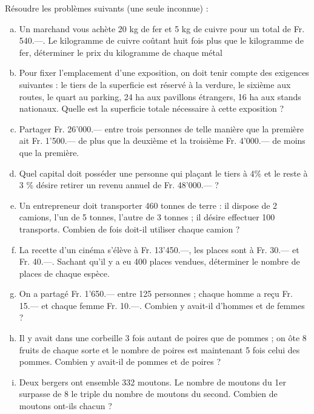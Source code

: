 \documentclass[12pt, addpoints]{exam}
\begin{document}
\begin{exercice}\label{exercice1}
Résoudre les problèmes suivants (une seule inconnue) :
\begin{enumerate}[a)]
\item Un marchand vous achète 20 kg de fer et 5 kg de cuivre pour un total de Fr. 540.—. Le kilogramme de cuivre coûtant huit fois plus que le kilogramme de fer, déterminer le prix du kilogramme de chaque métal

\item Pour fixer l’emplacement d’une exposition, on doit tenir compte des exigences suivantes : le tiers de la superficie est réservé à la verdure, le sixième aux routes, le quart au parking, 24 ha aux pavillons étrangers, 16 ha aux stands nationaux. Quelle est la superficie totale nécessaire à cette exposition ?

\item Partager Fr. 26'000.— entre trois personnes de telle manière que la première ait Fr. 1'500.— de plus que la deuxième et la troisième Fr. 4'000.— de moins que la première.

\item Quel capital doit posséder une personne qui plaçant le tiers à 4\% et le reste à 3 \% désire retirer un revenu annuel de Fr. 48'000.— ?

\item Un entrepreneur doit transporter 460 tonnes de terre : il dispose de 2 camions, l’un de 5 tonnes, l’autre de 3 tonnes ; il désire effectuer 100 transports. Combien de fois doit-il utiliser chaque camion ?

\item La recette d’un cinéma s’élève à Fr. 13'450.—, les places sont à Fr. 30.— et Fr. 40.—. Sachant qu’il y a eu 400 places vendues, déterminer le nombre de places de chaque espèce.

\item On a partagé Fr. 1'650.–– entre 125 personnes ; chaque homme a reçu Fr. 15.–– et chaque femme Fr. 10.––. Combien y avait-il d'hommes et de femmes ?

\item Il y avait dans une corbeille 3 fois autant de poires que de pommes ; on ôte 8 fruits de chaque sorte et le nombre de poires est maintenant 5 fois celui des pommes. Combien y avait-il de pommes et de poires ?

\item Deux bergers ont ensemble 332 moutons. Le nombre de moutons du 1er surpasse de 8 le triple du nombre de moutons du second. Combien de moutons ont-ils chacun ?


\end{enumerate}
\end{exercice}
\end{document}
